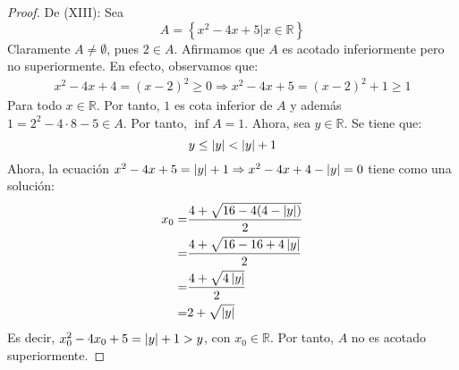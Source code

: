 \documentclass[12pt]{article}
\begin{document}
\begin{enumerate}
\begin{proof}
        De (XIII): Sea
        \begin{equation*}
            A = \left\{x^2-4x+5|x\in\mathbb{R}\right\}
        \end{equation*}
        Claramente $A\neq \emptyset$, pues $2\in A$. Afirmamos que $A$ es acotado inferiormente pero no superiormente. En efecto, observamos que:
        \begin{equation*}
            \begin{split}
                x^2-4x+4=(x-2)^2\geq0
                \Rightarrow x^2-4x+5=(x-2)^2+1\geq1
            \end{split}
        \end{equation*}
        Para todo $x\in\mathbb{R}$. Por tanto, $1$ es cota inferior de $A$ y además $1=2^2-4\cdot8-5\in A$. Por tanto, $\inf A = 1$. Ahora, sea $y\in\mathbb{R}$. Se tiene que:
        \begin{equation*}
            y\leq \left| y \right|< \left| y \right|+1
        \end{equation*}
        Ahora, la ecuación $x^2-4x+5=\left| y \right|+1\Rightarrow x^2-4x+4-\left| y \right|=0$ tiene como una solución:
        \begin{equation*}
            \begin{split}
                x_0=&\frac{4+\sqrt{16-4(4-\left| y \right|)}}{2}\\
                =&\frac{4+\sqrt{16-16+4\left| y \right|}}{2}\\
                =&\frac{4+\sqrt{4\left| y \right|}}{2}\\
                =&2+\sqrt{\left| y \right|}\\
            \end{split}
        \end{equation*}
        Es decir, $x_0^2-4x_0+5=\left| y \right|+1>y$, con $x_0\in\mathbb{R}$. Por tanto, $A$ no es acotado superiormente.


\end{proof}
\end{enumerate}
\end{document}
